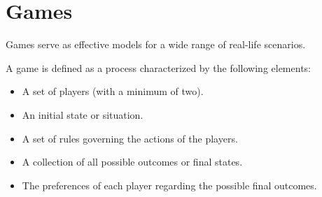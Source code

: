 \section{Games}

Games serve as effective models for a wide range of real-life scenarios.
\begin{definition}
    A game is defined as a process characterized by the following elements:
    \begin{itemize}
        \item A set of players (with a minimum of two).
        \item An initial state or situation.
        \item A set of rules governing the actions of the players.
        \item A collection of all possible outcomes or final states.
        \item The preferences of each player regarding the possible final outcomes.
    \end{itemize}
\end{definition}